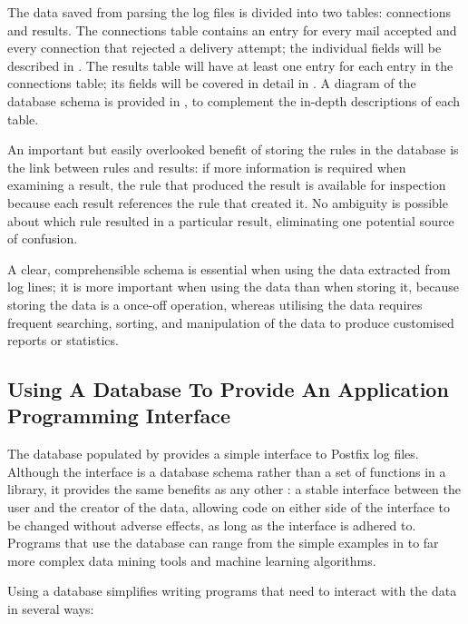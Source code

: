The data saved from parsing the log files is divided into two tables:
connections and results.  The connections table contains an entry for every
mail accepted and every connection that rejected a delivery attempt; the
individual fields will be described in .  The
results table will have at least one entry for each entry in the
connections table; its fields will be covered in detail in
.  A diagram of the database schema is provided
in , to complement the
in-depth descriptions of each table.

An important but easily overlooked benefit of storing the rules in the
database is the link between rules and results: if more information is
required when examining a result, the rule that produced the result is
available for inspection because each result references the rule that
created it.  No ambiguity is possible about which rule resulted in a
particular result, eliminating one potential source of confusion.

A clear, comprehensible schema is essential when using the data extracted
from log lines; it is more important when using the data than when storing
it, because storing the data is a once-off operation, whereas utilising
the data requires frequent searching, sorting, and manipulation of the data
to produce customised reports or statistics.

\subsection{Using A Database To Provide An Application Programming Interface}

\label{database as API}

The database populated by \parsername{} provides a simple interface to
Postfix log files.  Although the interface is a database schema rather than
a set of functions in a library, it provides the same benefits as any other
: a stable interface between the user and the creator of the
data, allowing code on either side of the interface to be changed without
adverse effects, as long as the interface is adhered to.  Programs that use
the database can range from the simple examples in 
to far more complex data mining tools and machine learning algorithms.

Using a database simplifies writing programs that need to interact with the
data in several ways:


